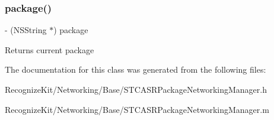 \subsubsection{\texorpdfstring{package()}{package()}}
{\footnotesize\ttfamily -\/ (N\+S\+String $\ast$) package \begin{DoxyParamCaption}{ }\end{DoxyParamCaption}}

Returns current package 

The documentation for this class was generated from the following files\+:\begin{DoxyCompactItemize}
\item 
Recognize\+Kit/\+Networking/\+Base/S\+T\+C\+A\+S\+R\+Package\+Networking\+Manager.\+h\item 
Recognize\+Kit/\+Networking/\+Base/S\+T\+C\+A\+S\+R\+Package\+Networking\+Manager.\+m\end{DoxyCompactItemize}
